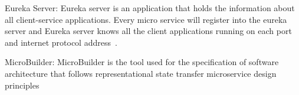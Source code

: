 \par Eureka Server: Eureka server is an application that holds the information about all client-service applications. Every micro service will register into the eureka server and Eureka server knows all the client applications running on each port and internet protocol address~\cite{Uber}.

\par MicroBuilder: MicroBuilder is the tool used for the specification of software architecture that follows representational state transfer microservice design principles~\cite{Branko2018} 


